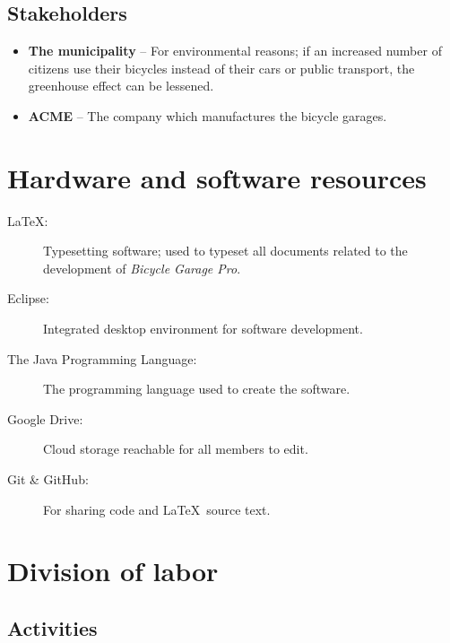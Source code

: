 \documentclass[12pt,titlepage]{article}
\begin{document}
\subsection{Stakeholders}

\begin{itemize}
	\item \textbf{The municipality} -- For environmental reasons; if an
		increased number of citizens use their bicycles instead of their
		cars or public transport, the greenhouse effect can be lessened.
	\item \textbf{ACME} -- The company which manufactures the bicycle
		garages.
\end{itemize}



\section{Hardware and software resources}
\label{sec:hardware-and-software-resources}

\begin{description}
	\item[\LaTeX:] Typesetting software; used to typeset all documents
		related to the development of \textit{Bicycle Garage Pro}.
	\item[Eclipse:] Integrated desktop environment for software development.
	\item[The Java Programming Language:] The programming language used to
		create the software.
	\item[Google Drive:] Cloud storage reachable for all members to edit.
	\item[Git \& GitHub:] For sharing code and \LaTeX~source text.
\end{description}



\section{Division of labor}

\subsection{Activities}
\end{document}
